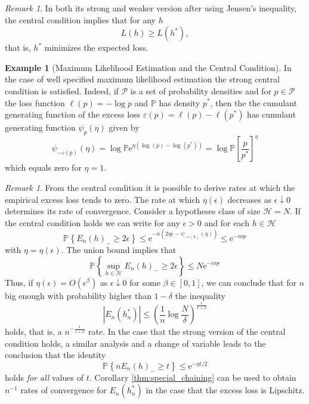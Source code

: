 \documentclass{uvamath}
\newcommand*{\calH}{\mathcal{H}}
\newcommand*{\calP}{\mathcal{P}}
\newcommand*{\bbP}{\mathbb{P}}
\newcommand*{\prob}[2][]{\mathbb{P}_{#1}\left\{#2\right\}}
\newcommand*{\expv}[1]{\mathbb{P}\left[#1\right]}
\newcommand*{\paren}[1]{\left(#1\right)}
\newcommand*{\rme}{\mathrm{e}}
\theoremstyle{remark}
\newtheorem{remark}[theorem]{Remark}
\theoremstyle{definition}
\theoremstyle{definition}
\theoremstyle{definition}
\newtheorem{example}[theorem]{Example}
\theoremstyle{definition}
\theoremstyle{definition}
\begin{document}
\begin{remark}
  In both its strong and weaker version after using Jensen's
  inequality, the central condition implies that for any $h$
  \begin{equation*}
    L(h) \geq L(h^*),
  \end{equation*}
  that is, $h^*$ minimizes the expected loss.
\end{remark}


\begin{example}[Maximum Likelihood Estimation and the Central
  Condition]
  \label{ex:mle_central}
  In the case of well specified maximum likelihood estimation the
  strong central condition is satisfied. Indeed, if $\calP$ is a set
  of probability densities and for $p\in\calP$ the loss function
  $\ell(p) = -\log p$ and $\bbP$ has density $p^*$, then the the
  cumulant generating function of the excess loss
  $\varepsilon(p) = \ell(p) - \ell(p^*)$ has cumulant generating
  function $\psi_p(\eta)$ given by
  \begin{equation*}
    \psi_{-\varepsilon(p)}(\eta) = \log \bbP\rme^{\eta(\log(p) - \log(p^*))} = \log
    \expv{\frac{p}{p^*}}^\eta
  \end{equation*}
  which equals zero for $\eta = 1$.
\end{example}

\begin{remark}
  From the central condition it is possible to derive rates at which
  the empirical excess loss tends to zero.  The rate at which
  $\eta(\epsilon)$ decreases as $\epsilon\downarrow 0$ determines its
  rate of convergence. Consider a hypotheses class of size
  $\calH=N$. If the central condition holds we can write for any
  $\epsilon>0$ and for each $h\in\calH$
  \begin{equation*}
    \prob{E_n(h)_-\geq  2\epsilon}\leq \rme^{-n( 2\eta\epsilon  -
      \psi_{-\varepsilon(h)}(\eta))} \leq \rme^{-n\eta\epsilon}
  \end{equation*}
  with $\eta=\eta(\epsilon)$. The union bound implies that
  \begin{equation*}
    \prob{\sup_{h\in\calH}E_n(h)_-\geq  2\epsilon} \leq N\rme^{-n\eta\epsilon}
  \end{equation*}
  Thus, if $\eta(\epsilon) = O(\epsilon^{\beta})$ as
  $\epsilon\downarrow 0$ for some $\beta\in[0,1]$, we can conclude
  that for $n$ big enough with probability higher than $1-\delta$ the
  inequality
  \begin{equation*}
    |E_n(h^*_n)|\leq \paren{\frac{1}{n}\log\frac{N}{\delta}}^{\frac{1}{1+\beta}}
  \end{equation*}
  holds, that is, a $n^{-\frac{1}{1+\beta}}$ rate.  In the case that
  the strong version of the central condition holds, a similar
  analysis and a change of variable leads to the conclusion that the
  identity
  \begin{equation*}
    \prob{nE_n(h)_-\geq t} \leq \rme^{-\eta t/2}
  \end{equation*}
  holds \textit{for all} values of $t$. Corollary
  \ref{thm:special_chaining} can be used to obtain $n^{-1}$ rates of
  convergence for $E_n(h^*_n)$ in the case that the excess loss is
  Lipschitz.
\end{remark}
\end{document}
